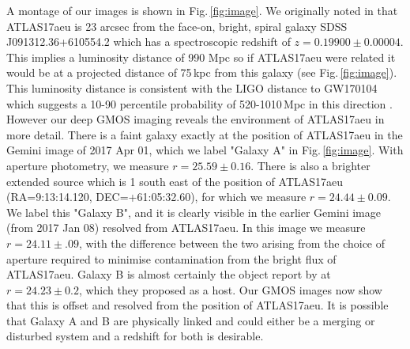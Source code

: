 \documentclass[twocolumn]{aastex61}
\begin{document}
A montage of our images is shown in Fig.\,\ref{fig:image}.  We originally noted in \cite{GCN20382} that ATLAS17aeu  is
23 arcsec from the face-on, bright, spiral galaxy SDSS J091312.36+610554.2 which
has a spectroscopic redshift of $z = 0.19900\pm0.00004$.  This implies a luminosity distance of 990 Mpc so if ATLAS17aeu were related it would be at a projected distance of 75\,kpc from this galaxy (see Fig.\,\ref{fig:image}).
This luminosity distance is consistent with the LIGO distance 
to  GW170104 which suggests a 10-90 percentile probability of 520-1010\,Mpc in this direction
\citep[from the analysis of][]{2016ApJ...829L..15S}. 
However our deep GMOS imaging reveals the environment of ATLAS17aeu in more detail. 
There is a faint galaxy exactly at the position of ATLAS17aeu in the 
Gemini image of 2017 Apr 01, which we label "Galaxy A" in Fig.\,\ref{fig:image}. 
With aperture photometry, we measure $r=25.59\pm0.16$. There is also a
brighter extended source which is 1 south east of the position of 
ATLAS17aeu  (RA=9:13:14.120, DEC=+61:05:32.60), for which we measure 
$r=24.44\pm0.09$. We label this "Galaxy B", and it is clearly visible in the 
earlier Gemini image (from 2017 Jan 08) resolved from ATLAS17aeu. In this image
we measure $r=24.11\pm.09$, with the difference between the two arising from the 
choice of aperture required to minimise contamination from the bright flux of 
ATLAS17aeu. Galaxy B is almost certainly the object report by 
\cite{GCN20735} at $r=24.23\pm0.2$, which they proposed as a host. 
Our GMOS images now show that this is offset and resolved from the position of 
ATLAS17aeu. It is possible that Galaxy A and B are 
physically linked and could either be a merging or 
disturbed system and a redshift for both is desirable. 
\end{document}
